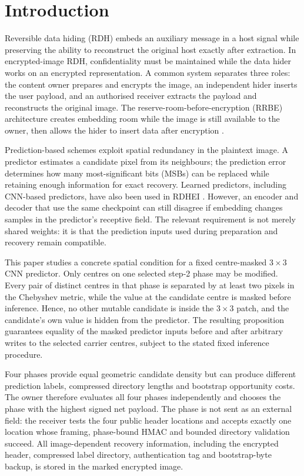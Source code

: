 \documentclass[preprint,12pt,a4paper]{elsarticle}
\newcommand{\RRBE}{\textsc{RRBE}\xspace}
\begin{document}
\section{Introduction}
\label{sec:intro}

Reversible data hiding (RDH) embeds an auxiliary message in a host signal while preserving the ability to reconstruct the original host exactly after extraction. In encrypted-image RDH, confidentiality must be maintained while the data hider works on an encrypted representation. A common system separates three roles: the content owner prepares and encrypts the image, an independent hider inserts the user payload, and an authorised receiver extracts the payload and reconstructs the original image. The reserve-room-before-encryption (\RRBE) architecture creates embedding room while the image is still available to the owner, then allows the hider to insert data after encryption \cite{zhang2011,ma2013,puteaux2021survey}.

Prediction-based schemes exploit spatial redundancy in the plaintext image. A predictor estimates a candidate pixel from its neighbours; the prediction error determines how many most-significant bits (MSBs) can be replaced while retaining enough information for exact recovery. Learned predictors, including CNN-based predictors, have also been used in RDHEI \cite{ping2024,cheng2025masked}. However, an encoder and decoder that use the same checkpoint can still disagree if embedding changes samples in the predictor's receptive field. The relevant requirement is not merely shared weights: it is that the prediction inputs used during preparation and recovery remain compatible.

This paper studies a concrete spatial condition for a fixed centre-masked $3\times3$ CNN predictor. Only centres on one selected step-2 phase may be modified. Every pair of distinct centres in that phase is separated by at least two pixels in the Chebyshev metric, while the value at the candidate centre is masked before inference. Hence, no other mutable candidate is inside the $3\times3$ patch, and the candidate's own value is hidden from the predictor. The resulting proposition guarantees equality of the masked predictor inputs before and after arbitrary writes to the selected carrier centres, subject to the stated fixed inference procedure.

Four phases provide equal geometric candidate density but can produce different prediction labels, compressed directory lengths and bootstrap opportunity costs. The owner therefore evaluates all four phases independently and chooses the phase with the highest signed net payload. The phase is not sent as an external field: the receiver tests the four public header locations and accepts exactly one location whose framing, phase-bound HMAC and bounded directory validation succeed. All image-dependent recovery information, including the encrypted header, compressed label directory, authentication tag and bootstrap-byte backup, is stored in the marked encrypted image.
\end{document}
